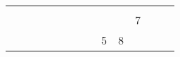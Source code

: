 \documentclass[12pt]{article}
\begin{document}
\begin{table}[]
{\begin{tabular}{clllllllllllllllllllllllllllllll}
\multicolumn{5}{|c|}{\cellcolor[HTML]{96FFFB}}                                                                                                               & \multicolumn{1}{l|}{} & \multicolumn{1}{l|}{} & \multicolumn{1}{l|}{} & \multicolumn{1}{l|}{} & \multicolumn{6}{l|}{\cellcolor[HTML]{FFFE65}}                                                                                                 & \multicolumn{1}{l|}{} & \multicolumn{1}{l|}{} & \multicolumn{9}{l|}{\cellcolor[HTML]{FD6864}}                                                                                                                                                                         & \multicolumn{1}{l|}{}            & \multicolumn{5}{l|}{\cellcolor[HTML]{CBCEFB}}                                                               \\ \cline{6-9} \cline{16-17} \cline{27-27}
\multicolumn{5}{|c|}{\cellcolor[HTML]{96FFFB}}                                                                                                               & \multicolumn{1}{l|}{} & \multicolumn{1}{l|}{} & \multicolumn{1}{l|}{} & \multicolumn{1}{l|}{} & \multicolumn{6}{l|}{\cellcolor[HTML]{FFFE65}}                                                                                                 & \multicolumn{1}{l|}{} & \multicolumn{1}{l|}{} & \multicolumn{9}{l|}{\cellcolor[HTML]{FD6864}}                                                                                                                                                                         & \multicolumn{1}{l|}{}            & \multicolumn{5}{l|}{\multirow{-12}{*}{\cellcolor[HTML]{CBCEFB}7}}                                           \\ \cline{6-9} \cline{16-17} \cline{27-32} 
\multicolumn{5}{|c|}{\cellcolor[HTML]{96FFFB}}                                                                                                               & \multicolumn{1}{l|}{} & \multicolumn{1}{l|}{} & \multicolumn{1}{l|}{} & \multicolumn{1}{l|}{} & \multicolumn{6}{l|}{\multirow{-4}{*}{\cellcolor[HTML]{FFFE65}}}                                                                               & \multicolumn{1}{l|}{} & \multicolumn{1}{l|}{} & \multicolumn{9}{l|}{\multirow{-6}{*}{\cellcolor[HTML]{FD6864}5}}                                                                                                                                                      & \multicolumn{2}{l|}{\cellcolor[HTML]{FFFE65}8} & \multicolumn{1}{l|}{} & \multicolumn{1}{l|}{} & \multicolumn{1}{l|}{} & \multicolumn{1}{l|}{} \\ \cline{6-32} 

\end{tabular}}
\end{table}
\end{document}
